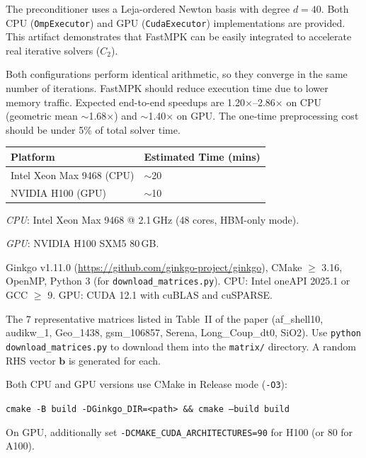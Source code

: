 \documentclass[conference]{IEEEtran}
\begin{document}
The preconditioner uses a Leja-ordered Newton basis with degree $d=40$. Both CPU (\texttt{OmpExecutor}) and GPU (\texttt{CudaExecutor}) implementations are provided. This artifact demonstrates that FastMPK can be easily integrated to accelerate real iterative solvers ($C_2$).

\artexp

Both configurations perform identical arithmetic, so they converge in the same number of iterations. FastMPK should reduce execution time due to lower memory traffic. Expected end-to-end speedups are 1.20$\times$--2.86$\times$ on CPU (geometric mean $\sim$1.68$\times$) and $\sim$1.40$\times$ on GPU. The one-time preprocessing cost should be under 5\% of total solver time.

\arttime

\begin{center}
\begin{tabular}{ll}
\toprule
Platform & Estimated Time (mins) \\
\midrule
Intel Xeon Max 9468 (CPU) & $\sim$20 \\
NVIDIA H100 (GPU)         & $\sim$10 \\
\bottomrule
\end{tabular}
\end{center}

\artin


\emph{CPU}: Intel Xeon Max 9468 @ 2.1\,GHz (48 cores, HBM-only mode).

\emph{GPU}: NVIDIA H100 SXM5 80\,GB.


Ginkgo v1.11.0 (\url{https://github.com/ginkgo-project/ginkgo}), CMake $\ge$ 3.16, OpenMP, Python 3 (for \texttt{download\_matrices.py}). CPU: Intel oneAPI 2025.1 or GCC $\ge$ 9. GPU: CUDA 12.1 with cuBLAS and cuSPARSE.


The 7 representative matrices listed in Table~II of the paper (af\_shell10, audikw\_1, Geo\_1438, gsm\_106857, Serena, Long\_Coup\_dt0, SiO2). Use \texttt{python download\_matrices.py} to download them into the \texttt{matrix/} directory. A random RHS vector $\mathbf{b}$ is generated for each.


Both CPU and GPU versions use CMake in Release mode (\texttt{-O3}):
\begin{center}
\texttt{cmake -B build -DGinkgo\_DIR=<path> \&\& cmake --build build}
\end{center}
On GPU, additionally set \texttt{-DCMAKE\_CUDA\_ARCHITECTURES=90} for H100 (or 80 for A100).
\end{document}
